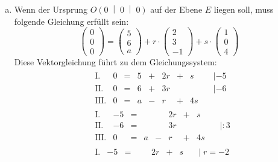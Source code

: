 \begin{exercise}
\begin{enumerate}[a)]
      \item Wenn der Ursprung $O\left(0\;\middle|\;0\;\middle|\;0\right)$
            auf der Ebene $E$ liegen soll, muss folgende Gleichung
            erfüllt sein:
            \begin{equation*}
              \begin{pmatrix}0\\0\\0\end{pmatrix}
              =
              \begin{pmatrix}5\\6\\a\end{pmatrix}
              +r\cdot
              \begin{pmatrix}2\\3\\-1\end{pmatrix}
              +s\cdot
              \begin{pmatrix}1\\0\\4\end{pmatrix}
            \end{equation*}
            Diese Vektorgleichung führt zu dem Gleichungssystem:
            \begin{align*}
              &
              \begin{array}{r|rcrcrcrl}
                  \text{I.} & 0 & = & 5 & + & 2r & + &  s & \quad|-5 \\
                 \text{II.} & 0 & = & 6 & + & 3r &   &    & \quad|-6 \\
                \text{III.} & 0 & = & a & - &  r & + & 4s & \quad
              \end{array}
              \\[2ex]
              &
              \begin{array}{r|rcrcrcrl}
                  \text{I.} & -5 & = &   &   & 2r & + &  s & \quad    \\
                 \text{II.} & -6 & = &   &   & 3r &   &    & \quad|:3 \\
                \text{III.} &  0 & = & a & - &  r & + & 4s & \quad
              \end{array}
              \\[2ex]
              &
              \begin{array}{r|rcrcrcrl}
                  \text{I.} & -5 & = &   &   & 2r & + &  s & \quad|\;r=-2 \\

\end{array}
\end{align*}
\end{enumerate}
\end{exercise}
